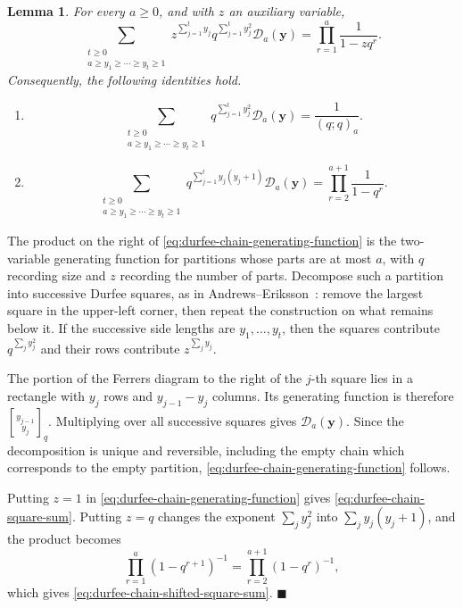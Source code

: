\documentclass[a4paper,11pt,reqno]{amsart}
\theoremstyle{plain}
\newtheorem{lemma}[theorem]{Lemma}
\theoremstyle{remark}
\numberwithin{equation}{section}
\newcommand{\qgauss}[2]{\genfrac{[}{]}{0pt}{}{#1}{#2}_q}
\renewcommand{\geq}{\geqslant}
\newenvironment{proofof}{{\bf Proof. }}{\hfill $\blacksquare$ \\}
\begin{document}
\begin{lemma}\label{lem:durfee-identities}
For every $a\geq 0$, and with $z$ an auxiliary variable,
\begin{equation}\label{eq:durfee-chain-generating-function}
\sum_{\substack{t\geq 0\\ a\geq y_1\geq\cdots\geq y_t\geq 1}}
        z^{\sum_{j=1}^t y_j}q^{\sum_{j=1}^t y_j^2}
        \mathcal D_a(\mathbf y)
        =
        \prod_{r=1}^a\frac{1}{1-zq^r}.
\end{equation}
Consequently, the following identities hold.
\begin{enumerate}
\item
\begin{equation}\label{eq:durfee-chain-square-sum}
\sum_{\substack{t\geq 0\\ a\geq y_1\geq\cdots\geq y_t\geq 1}}
        q^{\sum_{j=1}^t y_j^2}
        \mathcal D_a(\mathbf y)
        =
        \frac{1}{(q;q)_a}.
\end{equation}

\item
\begin{equation}\label{eq:durfee-chain-shifted-square-sum}
\sum_{\substack{t\geq 0\\ a\geq y_1\geq\cdots\geq y_t\geq 1}}
        q^{\sum_{j=1}^t y_j(y_j+1)}
        \mathcal D_a(\mathbf y)
        =
        \prod_{r=2}^{a+1}\frac{1}{1-q^r}.
\end{equation}
\end{enumerate}
\end{lemma}

\begin{proofof}
The product on the right of
\eqref{eq:durfee-chain-generating-function} is the two-variable generating
function for partitions whose parts are at most $a$, with $q$ recording size
and $z$ recording the number of parts. Decompose such a partition into
successive Durfee squares, as in
Andrews--Eriksson~\cite[Chap.~8, Sec.~8.5]{AndrewsEriksson}: remove the
largest square in the upper-left corner, then repeat the construction on what
remains below it. If the successive side lengths are
$y_1,\ldots,y_t$, then the squares contribute $q^{\sum_j y_j^2}$ and their
rows contribute $z^{\sum_j y_j}$.

The portion of the Ferrers diagram to the right of the $j$-th square lies in a
rectangle with $y_j$ rows and $y_{j-1}-y_j$ columns. Its generating function
is therefore $\qgauss{y_{j-1}}{y_j}$. Multiplying over all successive squares
gives $\mathcal D_a(\mathbf y)$. Since the decomposition is unique and
reversible, including the empty chain which corresponds to the empty partition,
\eqref{eq:durfee-chain-generating-function} follows.

Putting $z=1$ in \eqref{eq:durfee-chain-generating-function} gives
\eqref{eq:durfee-chain-square-sum}. Putting $z=q$ changes the exponent
$\sum_j y_j^2$ into $\sum_j y_j(y_j+1)$, and the product becomes
\[
        \prod_{r=1}^a(1-q^{r+1})^{-1}
        =
        \prod_{r=2}^{a+1}(1-q^r)^{-1},
\]
which gives \eqref{eq:durfee-chain-shifted-square-sum}.
\end{proofof}
\end{document}
